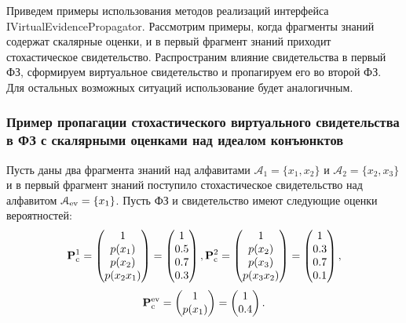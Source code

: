 Приведем примеры использования методов реализаций интерфейса IVirtualEvidencePropagator. Рассмотрим примеры, когда фрагменты знаний содержат скалярные оценки, и в первый фрагмент знаний приходит стохастическое свидетельство. Распространим влияние свидетельства в первый ФЗ, сформируем виртуальное свидетельство и пропагируем его во второй ФЗ. Для остальных возможных ситуаций использование будет аналогичным.
\subsubsection{Пример пропагации стохастического виртуального свидетельства в ФЗ с скалярными оценками над идеалом конъюнктов}
Пусть даны два фрагмента знаний над алфавитами $\mathcal{A}_1 = \{x_1, x_2\}$ и  $\mathcal{A}_2 = \{x_2, x_3\}$ и в первый фрагмент знаний поступило стохастическое свидетельство над алфавитом $\mathcal{A}_{\mathrm{ev}} = \{x_1\}$. Пусть ФЗ и свидетельство имеют следующие оценки вероятностей: \\ 
\begin{equation*}
\mathbf{P}_\mathrm{c}^1 =  \begin{pmatrix}
1 \\ p(x_1) \\ p(x_2) \\ p(x_2x_1)
\end{pmatrix} = \begin{pmatrix}
1 \\ 0.5\\ 0.7\\ 0.3
\end{pmatrix}, 
\mathbf{P}_\mathrm{c}^2 =  \begin{pmatrix}
1 \\ p(x_2) \\ p(x_3) \\ p(x_3x_2)
\end{pmatrix} = \begin{pmatrix}
1 \\ 0.3\\ 0.7\\ 0.1 
\end{pmatrix},
\end{equation*}
\begin{equation*}
\mathbf{P}_\mathrm{c}^{\mathrm{ev}} = \begin{pmatrix}  1 \\ p(x_1)	\end{pmatrix} = \begin{pmatrix}
1 \\ 0.4
\end{pmatrix}.
\end{equation*}


